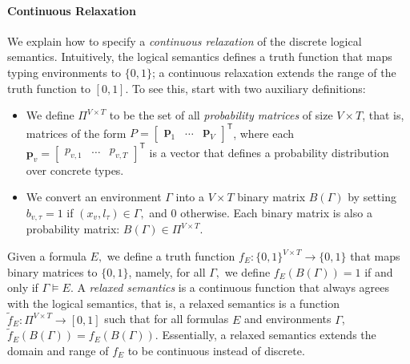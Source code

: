 \documentclass[acmsmall, review, anonymous]{acmart}\settopmatter{printfolios=true,printccs=false,printacmref=false}
\begin{document}
\paragraph{Continuous Relaxation}
We explain how to specify a \emph{continuous relaxation} of the discrete logical semantics. Intuitively, the logical semantics defines a truth function that maps typing environments to $\{0, 1\}$; a continuous
relaxation extends the range of the truth function to $[0, 1].$
To see this, start with two auxiliary definitions:
\begin{itemize}
    \item We define $\Pi^{V \times T}$ to be the set
of all \emph{probability matrices} of size $V \times T$,
that is, matrices of the form $P = \begin{bmatrix} \bm{p}_1 & \ldots & \bm{p}_{V} \end{bmatrix}^\mathsf{T}$,
where each $\bm{p}_v = \begin{bmatrix} p_{v,1} & \ldots & p_{v,{T}} \end{bmatrix}^\mathsf{T}$
is a vector that defines a probability distribution over concrete types.
    \item We convert an environment $\Gamma$ into a $V \times T$ binary matrix $B(\Gamma)$ by setting $b_{v,\tau} = 1$ if $(x_v, l_\tau) \in \Gamma,$ and 0 otherwise.
    Each binary matrix is also a probability matrix: $B(\Gamma) \in \Pi^{V \times T}$.
\end{itemize}
Given a formula $E,$ we define a truth function $f_E: \{0, 1\}^{V \times T} \rightarrow \{0, 1\}$
that maps binary matrices to $\{0, 1\}$, namely, for all $\Gamma,$ we define $f_{E}(B(\Gamma)) = 1$ if and only if $\Gamma \models E$.
A \emph{relaxed semantics} is a continuous function
that always agrees with the logical semantics, that is,
a relaxed semantics is a function
$\tilde{f}_{E} : \Pi^{V \times T}  \rightarrow [0, 1]$
such that for all formulas $E$ and environments $\Gamma$,
$\tilde{f}_{E}(B(\Gamma)) = f_E(B(\Gamma))$.
Essentially, a relaxed semantics extends the domain and range
of $f_E$ to be continuous instead of discrete.

\end{document}
